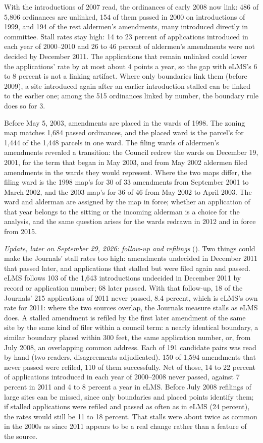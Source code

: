 With the introductions of 2007 read, the ordinances of early 2008 now link: 486 of 5,806 ordinances are unlinked,
154 of them passed in 2000 on introductions of 1999, and 194 of the rest aldermen's amendments, many introduced
directly in committee. Stall rates stay high: 14 to 23 percent of applications introduced in each year of 2000--2010
and 26 to 46 percent of aldermen's amendments were not decided by December 2011. The applications that remain unlinked
could lower the applications' rate by at most about 4 points a year, so the gap with eLMS's 6 to 8 percent is not a
linking artifact. Where only boundaries link them (before 2009), a site introduced again after an earlier
introduction stalled can be linked to the earlier one; among the 515 ordinances linked by number, the boundary rule
does so for 3.

Before May 5, 2003, amendments are placed in the wards of 1998. The zoning map matches 1,684 passed ordinances, and
the placed ward is the parcel's for 1,444 of the 1,448 parcels in one ward. The filing wards of aldermen's
amendments revealed a transition: the Council redrew the wards on December 19, 2001, for the term that began in May
2003, and from May 2002 aldermen filed amendments in the wards they would represent. Where the two maps differ, the
filing ward is the 1998 map's for 30 of 33 amendments from September 2001 to March 2002, and the 2003 map's for 36 of
46 from May 2002 to April 2003. The ward and alderman are assigned by the map in force; whether an application of
that year belongs to the sitting or the incoming alderman is a choice for the analysis, and the same question arises
for the wards redrawn in 2012 and in force from 2015.

\textit{Update, later on September 29, 2026: follow-up and refilings} ().
Two things could make the Journals' stall rates too high: amendments undecided in December 2011 that passed later,
and applications that stalled but were filed again and passed. eLMS follows 103 of the 1,643 introductions undecided
in December 2011 by record or application number; 68 later passed. With that follow-up, 18 of the Journals' 215
applications of 2011 never passed, 8.4 percent, which is eLMS's own rate for 2011: where the two sources overlap,
the Journals measure stalls as eLMS does. A stalled amendment is refiled by the first later amendment of the same
site by the same kind of filer within a council term: a nearly identical boundary, a similar boundary placed within
300 feet, the same application number, or, from July 2008, an overlapping common address. Each of 191 candidate pairs
was read by hand (two readers, disagreements adjudicated). 150 of 1,594 amendments that never passed were refiled,
110 of them successfully. Net of those, 14 to 22 percent of applications introduced in each year of 2000--2008 never
passed, against 7 percent in 2011 and 4 to 8 percent a year in eLMS. Before July 2008 refilings of large sites can be
missed, since only boundaries and placed points identify them; if stalled applications were refiled and passed as
often as in eLMS (24 percent), the rates would still be 11 to 18 percent. That stalls were about twice as common in
the 2000s as since 2011 appears to be a real change rather than a feature of the source.

